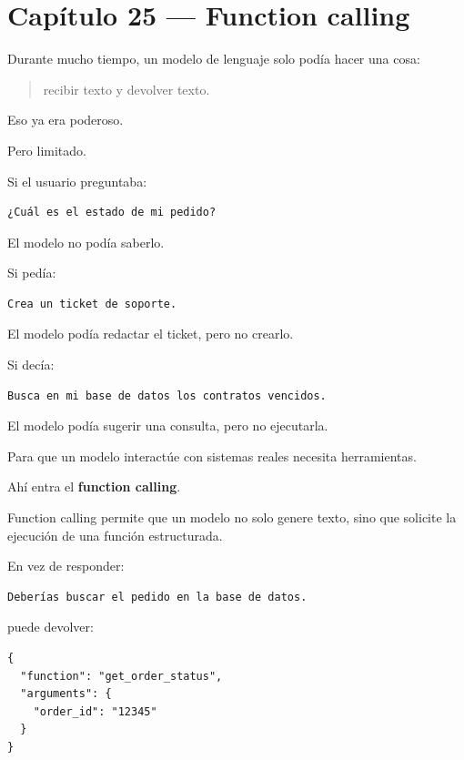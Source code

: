 \newpage

\chapter{Capítulo 25 --- Function
calling}\label{capuxedtulo-25-function-calling}

Durante mucho tiempo, un modelo de lenguaje solo podía hacer una cosa:

\begin{quote}
recibir texto y devolver texto.
\end{quote}

Eso ya era poderoso.

Pero limitado.

Si el usuario preguntaba:

\begin{lstlisting}
¿Cuál es el estado de mi pedido?
\end{lstlisting}

El modelo no podía saberlo.

Si pedía:

\begin{lstlisting}
Crea un ticket de soporte.
\end{lstlisting}

El modelo podía redactar el ticket, pero no crearlo.

Si decía:

\begin{lstlisting}
Busca en mi base de datos los contratos vencidos.
\end{lstlisting}

El modelo podía sugerir una consulta, pero no ejecutarla.

Para que un modelo interactúe con sistemas reales necesita herramientas.

Ahí entra el \textbf{function calling}.

Function calling permite que un modelo no solo genere texto, sino que
solicite la ejecución de una función estructurada.

En vez de responder:

\begin{lstlisting}
Deberías buscar el pedido en la base de datos.
\end{lstlisting}

puede devolver:

\begin{lstlisting}
{
  "function": "get_order_status",
  "arguments": {
    "order_id": "12345"
  }
}
\end{lstlisting}

